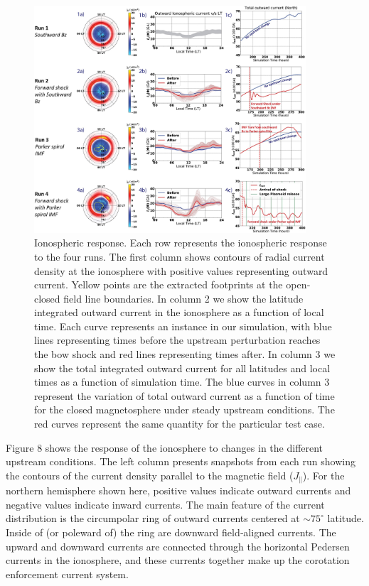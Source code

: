 \begin{figure}
    \centering
    \includegraphics[width=0.9\textwidth]{images3/ionosphere-currents.jpg}
    \caption{Ionospheric response. Each row represents the ionospheric response to the four runs. The first column shows contours of radial current density at the ionosphere with positive values representing outward current. Yellow points are the extracted footprints at the open‐closed field line boundaries. In column 2 we show the latitude integrated outward current in the ionosphere as a function of local time. Each curve represents an instance in our simulation, with blue lines representing times before the upstream perturbation reaches the bow shock and red lines representing times after. In column 3 we show the total integrated outward current for all latitudes and local times as a function of simulation time. The blue curves in column 3 represent the variation of total outward current as a function of time for the closed magnetosphere under steady upstream conditions. The red curves represent the same quantity for the particular test case.}
    \label{fig:ionosphere-currents}
\end{figure}

Figure 8 shows the response of the ionosphere to changes in the different upstream conditions. The left column presents snapshots from each run showing the contours of the current density parallel to the magnetic field ($J_\parallel$). For the northern hemisphere shown here, positive values indicate outward currents and negative values indicate inward currents. The main feature of the current distribution is the circumpolar ring of outward currents centered at $\sim75^\circ$ latitude. Inside of (or poleward of) the ring are downward field‐aligned currents. The upward and downward currents are connected through the horizontal Pedersen currents in the ionosphere, and these currents together make up the corotation enforcement current system. 

